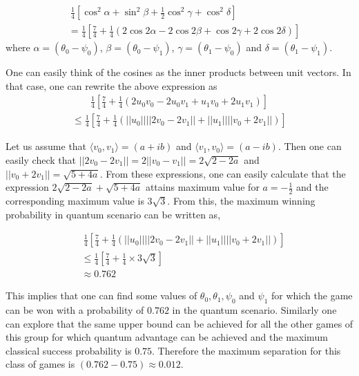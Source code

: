 \documentclass[]{svjour3}
\begin{document}

\begin{align*}
~ &~ \frac{1}{4}\left[\cos^2{\alpha} + \sin^2 {\beta} + \frac{1}{2}\cos^2 {\gamma} + \cos^2 {\delta}\right]\\
~ &= \frac{1}{4}\left[\frac{7}{4} + \frac{1}{4}(2\cos{2\alpha} - 2\cos{2\beta} + \cos{2\gamma} + 2\cos{2\delta})\right]
\end{align*}
where $\alpha=(\theta_0 - \psi_0)$, $\beta=(\theta_0 - \psi_1)$, $\gamma=(\theta_1 - \psi_0)$ and 
$\delta=(\theta_1 - \psi_1)$. 

One can easily think of the cosines as the inner products between unit vectors. In that case, one can rewrite the above expression as
\begin{align*}
\frac{1}{4}\left[\frac{7}{4} + \frac{1}{4}(2u_{0}v_{0} - 2u_{0}v_{1} + u_{1}v_{0} + 2u_{1}v_{1})\right]
\end{align*}
\begin{align*}
\le \frac{1}{4} \left[\frac{7}{4} + \frac{1}{4}\left(||u_{0}|| ||2v_{0} - 2v_{1}|| + ||u_{1}|| ||v_{0} + 2v_{1}||\right) \right]
\end{align*}

Let us assume that $\langle v_0, v_1 \rangle = (a + ib)$ and $\langle v_1, v_0 \rangle = (a - ib)$. Then one can easily check that $||2v_0 - 2v_1|| = 2||v_0 - v_1|| = 2\sqrt{2 - 2a}$ and $||v_0 + 2v_1|| = \sqrt{5 + 4a}$. From these expressions, one can easily calculate that the expression $2\sqrt{2 - 2a} + \sqrt{5 + 4a}$ attains maximum value for $a = -\frac{1}{2}$ and the corresponding maximum value is $3\sqrt{3}$. From this, the maximum winning probability in quantum scenario can be written as,

\begin{align*}
&~ \frac{1}{4} \left[\frac{7}{4} + \frac{1}{4}\left(||u_{0}|| ||2v_{0} - 2v_{1}|| + ||u_{1}|| ||v_{0} + 2v_{1}||\right) \right]\\
&\leq \frac{1}{4} \left[\frac{7}{4} + \frac{1}{4} \times 3\sqrt{3}\right]\\
&\approx 0.762
\end{align*}


This implies that one can find some values of $\theta_0, \theta_1, \psi_0$ and $\psi_1$ for which the game can be won with a probability of $0.762$ in the quantum scenario. Similarly one can explore that the same upper bound can be achieved for all the other games of this group for which quantum advantage can be achieved and the maximum classical success probability is $0.75$.
Therefore the maximum separation for this class of games is $(0.762 - 0.75) \approx 0.012$.
\end{document}
